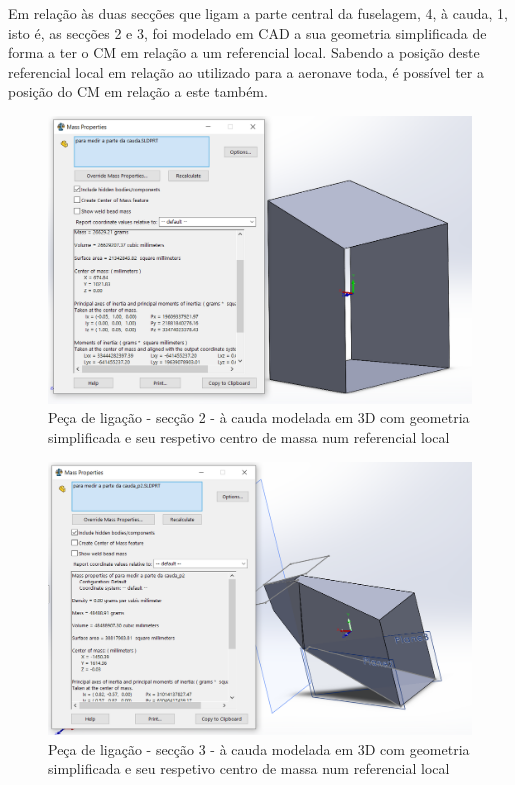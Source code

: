 \FloatBarrier
Em relação às duas secções que ligam a parte central da fuselagem, 4, à cauda, 1, isto é, as secções 2 e 3, foi modelado em CAD a sua geometria simplificada de forma a ter o CM em relação a um referencial local. Sabendo a posição deste referencial local em relação ao utilizado para a aeronave toda, é possível ter a posição do CM em relação a este também.\par
\FloatBarrier
\begin{figure}[h]
    \centering
    \includegraphics[width=\textwidth]{Imagens/CM_lig_cauda_1.PNG}
    \caption{Peça de ligação - secção 2 - à cauda modelada em 3D com geometria simplificada e seu respetivo centro de massa num referencial local}
    \label{lig_cauda_1}
\end{figure}
\begin{figure}[h]
    \centering
    \includegraphics[width=\textwidth]{Imagens/CM_lig_cauda_2.PNG}
    \caption{Peça de ligação - secção 3 - à cauda modelada em 3D com geometria simplificada e seu respetivo centro de massa num referencial local}
    \label{lig_cauda_2}
\end{figure}
